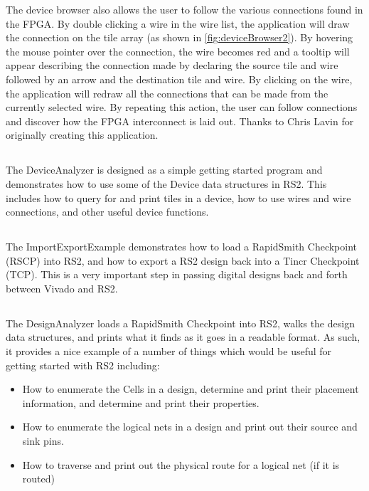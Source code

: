 The device browser also allows the user to follow the various connections found
in the FPGA.  By double clicking a wire in the wire list, the application will
draw the connection on the tile array (as shown in
\autoref{fig:deviceBrowser2}). By hovering the mouse pointer over the
connection, the wire becomes red and a tooltip will appear describing the
connection made by declaring the source tile and wire followed by an arrow and
the destination tile and wire.  By clicking on the wire, the application will
redraw all the connections that can be made from the currently selected wire. 
By repeating this action, the user can follow connections and discover how the
FPGA interconnect is laid out. Thanks to Chris Lavin for originally creating
this application.

\subsection{}
The DeviceAnalyzer is designed as a simple getting started program and
demonstrates how to use some of the Device data structures in RS2. This
includes how to query for and print tiles in a device, how to use wires and
wire connections, and other useful device functions.

\subsection{} \label{sec:importExportExample}
The ImportExportExample demonstrates how to load a RapidSmith Checkpoint
(RSCP) into RS2, and how to export a RS2 design back into a Tincr
Checkpoint (TCP). This is a very important step in passing digital designs back
and forth between Vivado and RS2.

\subsection{}
The DesignAnalyzer loads a RapidSmith Checkpoint into RS2, walks
the design data structures, and prints what it finds as it goes in a
readable format. As such, it provides a nice example of a number of things which would
be useful for getting started with RS2 including:
\begin{itemize}
  \item How to enumerate the Cells in a design, determine and print their 
  placement information, and determine and print their properties.
  \item How to enumerate the logical nets in a design and print out their source
  and sink pins. 
  \item How to traverse and print out the physical route for a logical net (if
  it is routed)  
\end{itemize}

